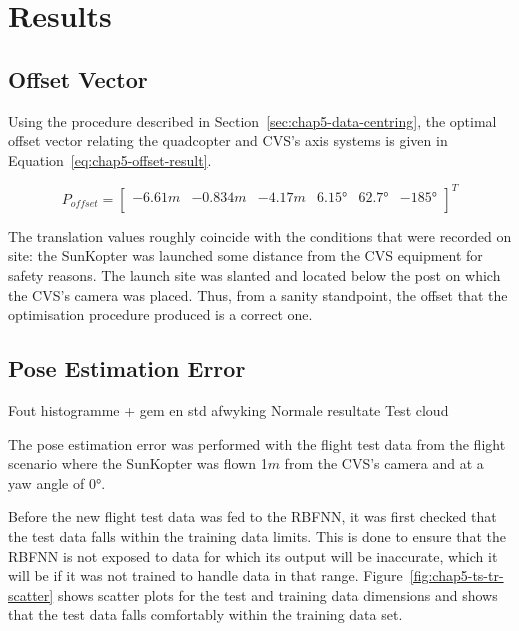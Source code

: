 \section{Results}

\subsection{Offset Vector}

Using the procedure described in Section~\ref{sec:chap5-data-centring}, the optimal offset vector relating the quadcopter and CVS's axis systems is given in Equation~\ref{eq:chap5-offset-result}. 

\begin{equation}
  \label{eq:chap5-offset-result}
  P_{offset} = 
  \begin{bmatrix}
    -6.61m & -0.834m & -4.17m & \ang{6.15} & \ang{62.7} & \ang{-185} \\
  \end{bmatrix}^T
\end{equation}

The translation values roughly coincide with the conditions that were recorded on site: the SunKopter was launched some distance from the CVS equipment for safety reasons. The launch site was slanted and located below the post on which the CVS's camera was placed. Thus, from a sanity standpoint, the offset that the optimisation procedure produced is a correct one. 

\subsection{Pose Estimation Error}

Fout histogramme + gem en std afwyking
Normale resultate
Test cloud

The pose estimation error was performed with the flight test data from the flight scenario where the SunKopter was flown 1$m$ from the CVS's camera and at a yaw angle of $\ang{0}$. 

Before the new flight test data was fed to the RBFNN, it was first checked that the test data falls within the training data limits. This is done to ensure that the RBFNN is not exposed to data for which its output will be inaccurate, which it will be if it was not trained to handle data in that range. Figure~\ref{fig:chap5-ts-tr-scatter} shows scatter plots for the test and training data dimensions and shows that the test data falls comfortably within the training data set. 

